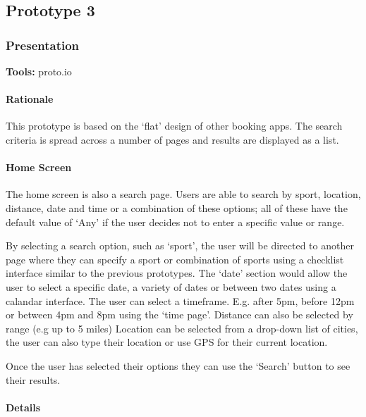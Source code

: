 \subsection{Prototype 3}
\label{sub:prototype_3}

\subsubsection{Presentation}
\textbf{Tools:} proto.io

\paragraph{Rationale}

This prototype is based on the `flat' design of other booking apps. The search
criteria is spread across a number of pages and results are displayed as a
list.

\paragraph{Home Screen}

The home screen is also a search page. Users are able to search by sport,
location, distance, date and time or a combination of these options; all of
these have the default value of `Any' if the user decides not to enter a
specific value or range.

By selecting a search option, such as `sport', the user will be directed to
another page where they can specify a sport or combination of sports using a
checklist interface similar to the previous prototypes. The `date' section
would allow the user to select a specific date, a variety of dates or between
two dates using a calandar interface. The user can select a timeframe. E.g.
after 5pm, before 12pm or between 4pm and 8pm using the `time page'. Distance
can also be selected by range (e.g up to 5 miles) Location can be selected from
a drop-down list of cities, the user can also type their location or use GPS
for their current location.

Once the user has selected their options they can use the `Search' button to
see their results.

\paragraph{Details}

